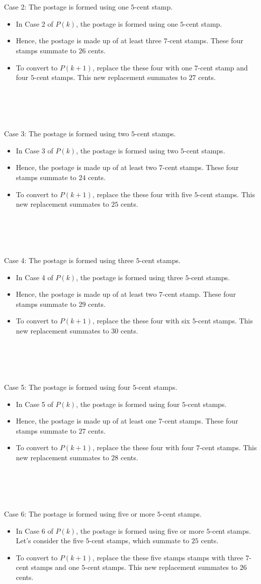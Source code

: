 \documentclass[12pt]{article}
\newcommand{\xlist}[1]{
    \begin{itemize}
        \renewcommand{\labelitemi}{$\centerdot$}
        #1
    \end{itemize}
    \newblock
    \\ \\
}
\begin{document}
\\ \\
Case 2: The postage is formed using one $5$-cent stamp.
\xlist{
    \item In Case 2 of $P(k)$, the postage is formed using one $5$-cent stamp.
    \item Hence, the postage is made up of at least three $7$-cent stamps. These four stamps summate to $26$ cents.
    \item To convert to $P(k+1)$, replace the these four with one $7$-cent stamp and four $5$-cent stamps. This new replacement summates to $27$ cents. 
}
\\ \\
Case 3: The postage is formed using two $5$-cent stamps.
\xlist{
    \item In Case 3 of $P(k)$, the postage is formed using two $5$-cent stamps.
    \item Hence, the postage is made up of at least two $7$-cent stamps. These four stamps summate to $24$ cents.
    \item To convert to $P(k+1)$, replace the these four with five $5$-cent stamps. This new replacement summates to $25$ cents.
}
\\ \\
Case 4: The postage is formed using three $5$-cent stamps.
\xlist{
    \item In Case 4 of $P(k)$, the postage is formed using three $5$-cent stamps.
    \item Hence, the postage is made up of at least two $7$-cent stamp. These four stamps summate to $29$ cents.
    \item To convert to $P(k+1)$, replace the these four with six $5$-cent stamps. This new replacement summates to $30$ cents.
}
\\ \\
Case 5: The postage is formed using four $5$-cent stamps.
\xlist{
    \item In Case 5 of $P(k)$, the postage is formed using four $5$-cent stamps.
    \item Hence, the postage is made up of at least one $7$-cent stamps. These four stamps summate to $27$ cents.
    \item To convert to $P(k+1)$, replace the these four with four $7$-cent stamps. This new replacement summates to $28$ cents. 
}
\\ \\
Case 6: The postage is formed using five or more $5$-cent stamps.
\xlist{
    \item In Case 6 of $P(k)$, the postage is formed using five or more $5$-cent stamps. Let's consider the five $5$-cent stamps, which summate to $25$ cents.
    \item To convert to $P(k+1)$, replace the these five stamps stamps with three $7$-cent stamps and one $5$-cent stamps. This new replacement summates to $26$ cents. 
}
\end{document}
